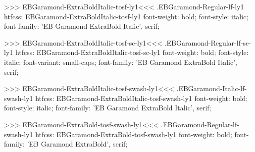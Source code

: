 {{>>>
\<EBGaramond-ExtraBoldItalic-tosf-ly1\><<<
.EBGaramond-Regular-lf-ly1
htfcss:  EBGaramond-ExtraBoldItalic-tosf-ly1  font-weight: bold; font-style: italic; font-family: 'EB Garamond ExtraBold Italic', serif;

>>>
\<EBGaramond-ExtraBoldItalic-tosf-sc-ly1\><<<
.EBGaramond-Regular-lf-sc-ly1
htfcss:  EBGaramond-ExtraBoldItalic-tosf-sc-ly1  font-weight: bold; font-style: italic; font-variant: small-caps; font-family: 'EB Garamond ExtraBold Italic', serif;

>>>
\<EBGaramond-ExtraBoldItalic-tosf-swash-ly1\><<<
.EBGaramond-Italic-lf-swash-ly1
htfcss:  EBGaramond-ExtraBoldItalic-tosf-swash-ly1  font-weight: bold; font-style: italic; font-family: 'EB Garamond ExtraBold Italic', serif;

>>>
\<EBGaramond-ExtraBold-tosf-swash-ly1\><<<
.EBGaramond-Regular-lf-swash-ly1
htfcss:  EBGaramond-ExtraBold-tosf-swash-ly1  font-weight: bold; font-family: 'EB Garamond ExtraBold', serif;

}}
